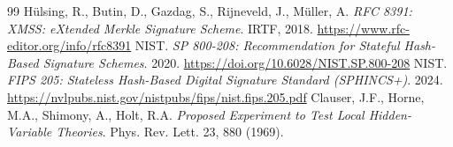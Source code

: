 \documentclass[11pt]{article}
\begin{document}
\begin{thebibliography}{99}
 H\"{u}lsing, R., Butin, D., Gazdag, S., Rijneveld, J., M\"{u}ller, A. \emph{RFC 8391: XMSS: eXtended Merkle Signature Scheme}. IRTF, 2018. \url{https://www.rfc-editor.org/info/rfc8391}
 NIST. \emph{SP 800-208: Recommendation for Stateful Hash-Based Signature Schemes}. 2020. \url{https://doi.org/10.6028/NIST.SP.800-208}
 NIST. \emph{FIPS 205: Stateless Hash-Based Digital Signature Standard (SPHINCS+)}. 2024. \url{https://nvlpubs.nist.gov/nistpubs/fips/nist.fips.205.pdf}
 Clauser, J.F., Horne, M.A., Shimony, A., Holt, R.A. \emph{Proposed Experiment to Test Local Hidden-Variable Theories}. Phys. Rev. Lett. 23, 880 (1969).
\end{thebibliography}
\end{document}
